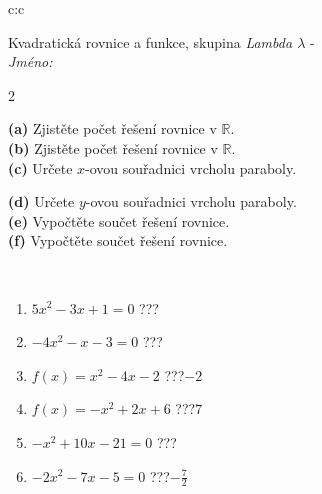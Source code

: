 \documentclass[10pt]{report}
\begin{document}
\begin{tabular}{c:c}
\begin{minipage}[c][104.5mm][t]{0.5\linewidth}
\begin{center}
\vspace{7mm}
{\huge \LARGE Kvadratická rovnice a funkce, skupina \textit{Lambda $\lambda$} -}\\[5mm]
\textit{Jméno:}\phantom{xxxxxxxxxxxxxxxxxxxxxxxxxxxxxxxxxxxxxxxxxxxxxxxxxxxxxxxxxxxxxxxxx}\\[5mm]
\begin{minipage}{0.95\linewidth}
\begin{center}
{\small \begin{multicols}{2} \raggedright
\textbf{(a)} Zjistěte počet řešení rovnice v \(\mathbb{R}\). \\[1mm]
\textbf{(b)} Zjistěte počet řešení rovnice v \(\mathbb{R}\). \\[1mm]
\textbf{(c)} Určete \(x\)-ovou souřadnici vrcholu paraboly. \par \columnbreak
\textbf{(d)} Určete \(y\)-ovou souřadnici vrcholu paraboly. \\[1mm]
\textbf{(e)} Vypočtěte součet řešení rovnice. \\[1mm]
\textbf{(f)} Vypočtěte součet řešení rovnice.
\end{multicols}
}
\end{center}
\end{minipage}
\\[4mm]
\begin{minipage}{0.79\linewidth}
\begin{center}
\begin{varwidth}{\linewidth}
\begin{enumerate}
\Large
\item $5x^2-3x+1=0$\quad \dotfill\; ???\;\dotfill {}
\item $-4x^2-x-3=0$\quad \dotfill\; ???\;\dotfill {}
\item $f(x)=x^2-4x-2$\quad \dotfill\; ???\;\dotfill \quad $-2$
\item $f(x)=-x^2+2x+6$\quad \dotfill\; ???\;\dotfill \quad $7$
\item $-x^2+10x-21=0$\quad \dotfill\; ???\;\dotfill {}
\item $-2x^2-7x-5=0$\quad \dotfill\; ???\;\dotfill \quad $-\frac{7}{2}$
\end{enumerate}
\end{varwidth}
\end{center}
\end{minipage}

\end{center}
\end{minipage}
\end{tabular}
\end{document}
